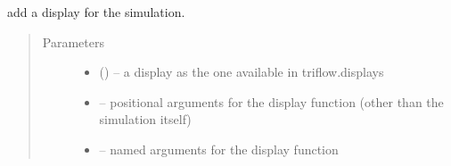 \documentclass[letterpaper,10pt,english]{sphinxmanual}
\begin{document}
\begin{fulllineitems}
\begin{sphinxVerbatim}[commandchars=\\\{\}]
       
    
                                  
    
   
\end{sphinxVerbatim}

\begin{fulllineitems}
\label{\detokenize{triflow.core:triflow.core.simulation.Simulation.add_display}}
add a display for the simulation.
\begin{quote}\begin{description}
\item[{Parameters}] \leavevmode\begin{itemize}
\item {} 
 () -- a display as the one available in triflow.displays

\item {} 
 -- positional arguments for the display function (other than the simulation itself)

\item {} 
 -- named arguments for the display function

\end{itemize}

\end{description}\end{quote}


\end{fulllineitems}
\end{fulllineitems}
\end{document}
